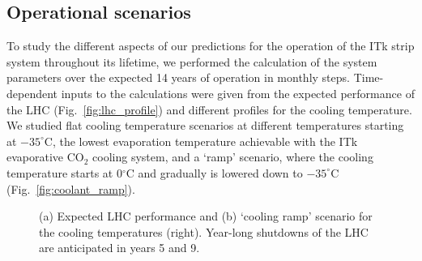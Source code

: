 
\subsection{Operational scenarios}\label{sec:opscenarios}
To study the different aspects of our predictions for the operation of the ITk strip system throughout its lifetime, we performed the calculation of the system parameters over the expected 14 years of operation in monthly steps. Time-dependent inputs to the calculations were given from the expected performance of the LHC (Fig.~\ref{fig:lhc_profile}) and different profiles for the cooling temperature. We studied flat cooling temperature scenarios at different temperatures starting at $-35^\circ$C, the lowest evaporation temperature achievable with the ITk evaporative CO$_2$ cooling system, and a `ramp' scenario, where the cooling temperature starts at 0$^\circ$C and gradually is lowered down to $-35^\circ$C (Fig.~\ref{fig:coolant_ramp}).

\begin{figure}[ht]
\centering
{}
\caption{(a) Expected LHC performance and (b) `cooling ramp' scenario for the cooling temperatures (right). Year-long shutdowns of the LHC are anticipated in years 5 and 9.}
\label{fig:opscenarios}
\end{figure}

